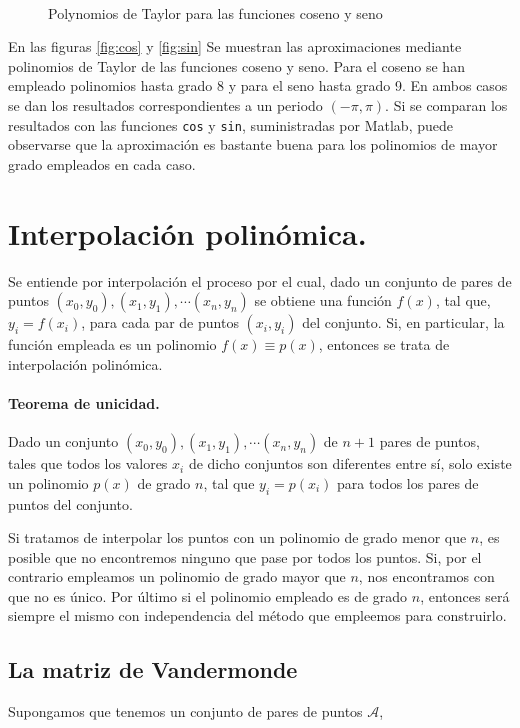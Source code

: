 \begin{figure}[h]
\centering
{} \qquad 
{}\\
\caption{Polynomios de Taylor para las funciones coseno y seno  }
\end{figure}
\begin{paracol}{2}
En las figuras \ref{fig:cos} y \ref{fig:sin} Se muestran las aproximaciones mediante polinomios de Taylor de las funciones coseno y seno. Para el coseno se han empleado polinomios hasta grado 8 y para el seno hasta grado 9. En ambos casos se dan los resultados correspondientes a un periodo $(-\pi, \pi)$. Si se comparan los resultados con las funciones \texttt{cos} y \texttt{sin}, suministradas por Matlab, puede observarse que la aproximación es bastante buena para los polinomios de mayor grado empleados en cada caso.

\section{Interpolación polinómica.}

Se entiende por interpolación el proceso por el cual, dado un conjunto de pares de puntos $(x_0,y_0),(x_1,y_1),\cdots (x_n,y_n)$ se obtiene una función $f(x)$, tal que, $y_i=f(x_i)$, para cada par de puntos $(x_i,y_i)$ del conjunto. Si, en particular, la función empleada es un polinomio $f(x)\equiv p(x)$, entonces se trata de interpolación polinómica. 

\paragraph{Teorema de unicidad.} Dado un conjunto   $(x_0,y_0),(x_1,y_1),\cdots (x_n,y_n)$ de $n+1$ pares de puntos, tales que todos los valores $x_i$ de dicho conjuntos son diferentes entre sí, solo existe un polinomio $p(x)$ de grado $n$, tal que $y_i=p(x_i)$ para todos los pares de puntos del conjunto.

Si tratamos de interpolar los puntos con un polinomio de grado menor que $n$, es posible que no encontremos ninguno que pase por todos los puntos. Si, por el contrario empleamos un polinomio de grado mayor que $n$, nos encontramos con que no es único. Por último si el polinomio empleado es de grado $n$, entonces será siempre el mismo con independencia del método que empleemos para construirlo.

\subsection{La matriz de Vandermonde} 
Supongamos que tenemos un conjunto de pares de puntos $\mathcal{A}$, 
\end{paracol}
